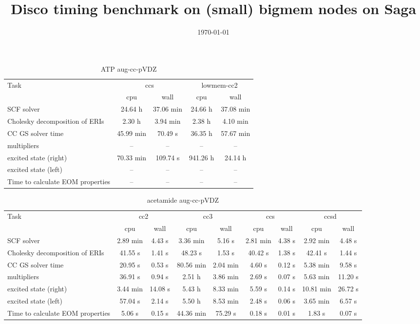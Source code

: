 \documentclass{article}
\title{Disco timing benchmark on (small) bigmem nodes on Saga}
\date{\today}
\begin{document}
\maketitle
\begin{table}
\caption{ATP aug-cc-pVDZ}
\begin{tabular}{lcccc}
\toprule
Task & \multicolumn{2}{c}{ccs} & \multicolumn{2}{c}{lowmem-cc2}\\
\cmidrule(lr){2-3}\cmidrule(lr){4-5}
 & cpu & wall & cpu & wall\\
\midrule
SCF solver & 24.64 h & 37.06 min & 24.66 h & 37.08 min\\
Cholesky decomposition of ERIs & 2.30 h & 3.94 min & 2.38 h & 4.10 min\\
CC GS solver time & 45.99 min & 70.49 s & 36.35 h & 57.67 min\\
multipliers & -- & -- & -- & --\\
excited state (right) & 70.33 min & 109.74 s & 941.26 h & 24.14 h\\
excited state (left) & -- & -- & -- & --\\
Time to calculate EOM properties & -- & -- & -- & --\\
\bottomrule
\end{tabular}
\end{table}
\begin{table}
\caption{acetamide aug-cc-pVDZ}
\begin{tabular}{lcccccccc}
\toprule
Task & \multicolumn{2}{c}{cc2} & \multicolumn{2}{c}{cc3} & \multicolumn{2}{c}{ccs} & \multicolumn{2}{c}{ccsd}\\
\cmidrule(lr){2-3}\cmidrule(lr){4-5}\cmidrule(lr){6-7}\cmidrule(lr){8-9}
 & cpu & wall & cpu & wall & cpu & wall & cpu & wall\\
\midrule
SCF solver & 2.89 min & 4.43 s & 3.36 min & 5.16 s & 2.81 min & 4.38 s & 2.92 min & 4.48 s\\
Cholesky decomposition of ERIs & 41.55 s & 1.41 s & 48.23 s & 1.53 s & 40.42 s & 1.38 s & 42.41 s & 1.44 s\\
CC GS solver time & 20.95 s & 0.53 s & 80.56 min & 2.04 min & 4.60 s & 0.12 s & 5.38 min & 9.58 s\\
multipliers & 36.91 s & 0.94 s & 2.51 h & 3.86 min & 2.69 s & 0.07 s & 5.63 min & 11.20 s\\
excited state (right) & 3.44 min & 14.08 s & 5.43 h & 8.33 min & 5.59 s & 0.14 s & 10.81 min & 26.72 s\\
excited state (left) & 57.04 s & 2.14 s & 5.50 h & 8.53 min & 2.48 s & 0.06 s & 3.65 min & 6.57 s\\
Time to calculate EOM properties & 5.06 s & 0.15 s & 44.36 min & 75.29 s & 0.18 s & 0.01 s & 1.83 s & 0.07 s\\
\bottomrule
\end{tabular}
\end{table}
\end{document}

